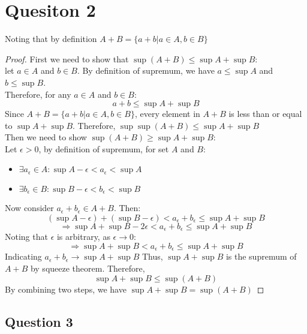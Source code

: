 \documentclass{article}
\begin{document}
\section*{Quesiton 2}
Noting that by definition \( A + B = \{ a + b | a \in A, b \in B \} \)

\begin{proof}
    First we need to show that \( \sup(A + B) \leq \sup A + \sup B \):
    \\
    let $a \in A$ and $b \in B$. By definition of supremum, we have $a \leq \sup A$ and $b \leq \sup B$.
    \\
    Therefore, for any $a \in A$ and $b \in B$:
    \[ a + b \leq \sup A + \sup B \]
    Since \( A + B = \{ a + b | a \in A, b \in B \} \), every element in $A + B$ is less than or equal to $\sup A + \sup B$.
    Therefore, \( \sup \sup(A + B) \leq \sup A + \sup B \)
    \\
    Then we need to show \( \sup(A + B) \geq \sup A + \sup B \):
    \\
    Let $\epsilon > 0$, by definition of supremum, for set $A$ and $B$:
    \begin{itemize}
        \item \( \exists a_{\epsilon} \in A : \sup A - \epsilon < a_{\epsilon} < \sup A \)
        \item \( \exists b_{\epsilon} \in B : \sup B - \epsilon < b_{\epsilon} < \sup B \)
    \end{itemize}
    Now consider $a_{\epsilon} + b_{\epsilon} \in A + B$. Then:
    \[ (\sup A - \epsilon) + (\sup B - \epsilon) < a_{\epsilon} + b_{\epsilon} \leq \sup A + \sup B \]
    \[ \Rightarrow \sup A + \sup B - 2 \epsilon < a_{\epsilon} + b_{\epsilon} \leq \sup A + \sup B \]
    Noting that $\epsilon$ is arbitrary, as $\epsilon \rightarrow 0$:
    \[ \Rightarrow \sup A + \sup B < a_{\epsilon} + b_{\epsilon} \leq \sup A + \sup B \]
    Indicating $a_{\epsilon} + b_{\epsilon} \rightarrow \sup A + \sup B$
    Thus, $\sup A + \sup B$ is the supremum of $A + B$ by squeeze theorem. Therefore,
    \[ \sup A + \sup B \leq \sup (A + B) \]
    By combining two steps, we have $\sup A + \sup B = \sup (A + B)$
\end{proof}

\subsection*{Question 3}
\end{document}
